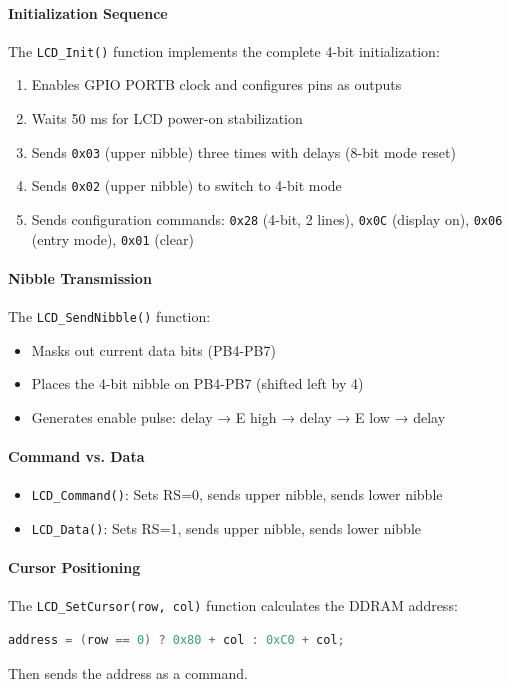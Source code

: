 \paragraph{Initialization Sequence}
The \texttt{LCD\_Init()} function implements the complete 4-bit initialization:
\begin{enumerate}[nosep]
  \item Enables GPIO PORTB clock and configures pins as outputs
  \item Waits 50 ms for LCD power-on stabilization
  \item Sends \texttt{0x03} (upper nibble) three times with delays (8-bit mode reset)
  \item Sends \texttt{0x02} (upper nibble) to switch to 4-bit mode
  \item Sends configuration commands: \texttt{0x28} (4-bit, 2 lines), \texttt{0x0C} (display on), \texttt{0x06} (entry mode), \texttt{0x01} (clear)
\end{enumerate}

\paragraph{Nibble Transmission}
The \texttt{LCD\_SendNibble()} function:
\begin{itemize}[nosep]
  \item Masks out current data bits (PB4-PB7)
  \item Places the 4-bit nibble on PB4-PB7 (shifted left by 4)
  \item Generates enable pulse: delay → E high → delay → E low → delay
\end{itemize}

\paragraph{Command vs. Data}
\begin{itemize}[nosep]
  \item \texttt{LCD\_Command()}: Sets RS=0, sends upper nibble, sends lower nibble
  \item \texttt{LCD\_Data()}: Sets RS=1, sends upper nibble, sends lower nibble
\end{itemize}

\paragraph{Cursor Positioning}
The \texttt{LCD\_SetCursor(row, col)} function calculates the DDRAM address:
\begin{lstlisting}[language=C]
address = (row == 0) ? 0x80 + col : 0xC0 + col;
\end{lstlisting}
\noindent
Then sends the address as a command.

